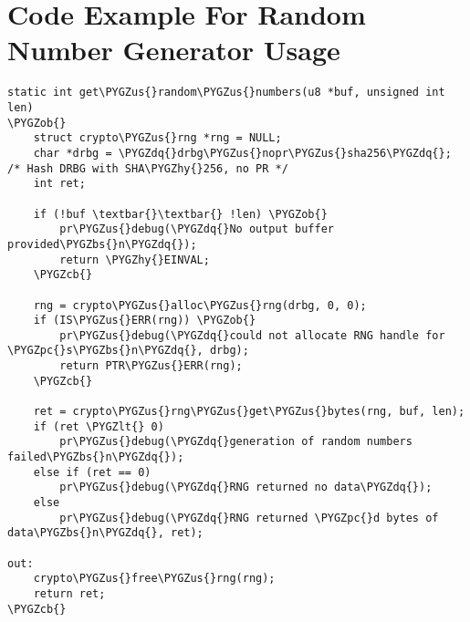 \documentclass[a4paper,8pt,english]{sphinxmanual}
\def\PYGZbs{\char`\\}
\def\PYGZus{\char`\_}
\def\PYGZob{\char`\{}
\def\PYGZcb{\char`\}}
\def\PYGZlt{\char`\<}
\def\PYGZpc{\char`\%}
\def\PYGZhy{\char`\-}
\def\PYGZdq{\char`\"}
\begin{document}
\section{Code Example For Random Number Generator Usage}
\label{crypto/api-samples:code-example-for-random-number-generator-usage}
\begin{Verbatim}[commandchars=\\\{\}]
static int get\PYGZus{}random\PYGZus{}numbers(u8 *buf, unsigned int len)
\PYGZob{}
    struct crypto\PYGZus{}rng *rng = NULL;
    char *drbg = \PYGZdq{}drbg\PYGZus{}nopr\PYGZus{}sha256\PYGZdq{}; /* Hash DRBG with SHA\PYGZhy{}256, no PR */
    int ret;

    if (!buf \textbar{}\textbar{} !len) \PYGZob{}
        pr\PYGZus{}debug(\PYGZdq{}No output buffer provided\PYGZbs{}n\PYGZdq{});
        return \PYGZhy{}EINVAL;
    \PYGZcb{}

    rng = crypto\PYGZus{}alloc\PYGZus{}rng(drbg, 0, 0);
    if (IS\PYGZus{}ERR(rng)) \PYGZob{}
        pr\PYGZus{}debug(\PYGZdq{}could not allocate RNG handle for \PYGZpc{}s\PYGZbs{}n\PYGZdq{}, drbg);
        return PTR\PYGZus{}ERR(rng);
    \PYGZcb{}

    ret = crypto\PYGZus{}rng\PYGZus{}get\PYGZus{}bytes(rng, buf, len);
    if (ret \PYGZlt{} 0)
        pr\PYGZus{}debug(\PYGZdq{}generation of random numbers failed\PYGZbs{}n\PYGZdq{});
    else if (ret == 0)
        pr\PYGZus{}debug(\PYGZdq{}RNG returned no data\PYGZdq{});
    else
        pr\PYGZus{}debug(\PYGZdq{}RNG returned \PYGZpc{}d bytes of data\PYGZbs{}n\PYGZdq{}, ret);

out:
    crypto\PYGZus{}free\PYGZus{}rng(rng);
    return ret;
\PYGZcb{}
\end{Verbatim}



\renewcommand{\indexname}{Index}
\printindex
\end{document}
